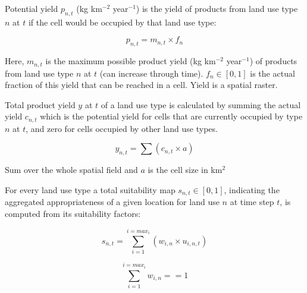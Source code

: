 \documentclass[a4paper,12pt]{article}
\begin{document}

Potential yield $p_{n,t}$ (kg km$^{-2}$ year$^{-1}$) is the yield of
products from land use type $n$ at $t$ if the cell would be occupied by
that land use type:

\begin{equation}
    p_{n,t} = m_{n,t} \times f_n
\end{equation}

Here, $m_{n,t}$ is the maximum possible product yield (kg km$^{-2}$
year$^{-1}$) of products from land use type $n$ at $t$ (can increase
through time). $f_n \in [0,1]$ is the actual fraction of this yield
that can be reached in a cell. Yield is a spatial raster.

%

Total product yield $y$ at $t$ of a land use type is calculated by summing
the actual yield $c_{n,t}$ which is the potential yield for cells that
are currently occupied by type $n$ at $t$, and zero for cells occupied
by other land use types.

\begin{equation}
    y_{n,t} = \sum (c_{n,t} \times a)
\end{equation}

Sum over the whole spatial field and $a$ is the cell size in km$^2$

For every land use type a total suitability map $s_{n,t}\in[0,1]$,
indicating the aggregated appropriateness of a given location for land
use $n$ at time step $t$, is computed from its suitability factors:

\begin{equation}
    s_{n,t} = \sum_{i=1}^{i=max_i} (w_{i,n} \times u_{i,n,t})
\end{equation}

\begin{equation}
    \sum_{i=1}^{i=max_i} w_{i,n} == 1
\end{equation}

%
\end{document}
